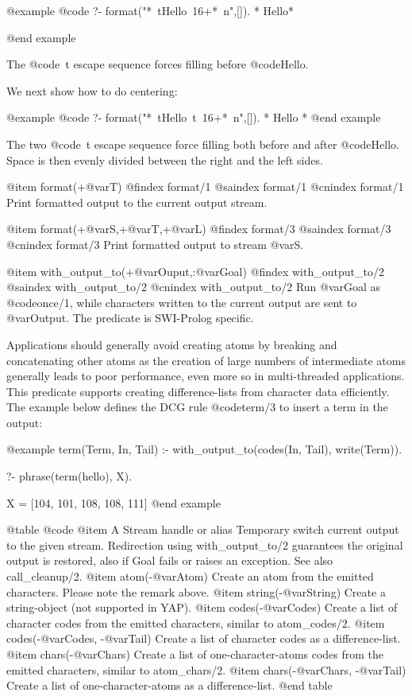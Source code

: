 {{{{{@example
@code{
   ?- format("*~tHello~16+*~n",[]).
*          Hello*
}

@end example


The @code{~t} escape sequence forces filling before @code{Hello}. 

We next show how to do centering:

@example
@code{
   ?- format("*~tHello~t~16+*~n",[]).
*     Hello     *
}
@end example


The two @code{~t} escape sequence force filling both before and after
@code{Hello}. Space is then evenly divided between the right and the
left sides.


@item format(+@var{T})
@findex format/1
@saindex format/1
@cnindex format/1
Print formatted output to the current output stream.


@item format(+@var{S},+@var{T},+@var{L})
@findex format/3
@saindex format/3
@cnindex format/3
Print formatted output to stream @var{S}.

@item with_output_to(+@var{Ouput},:@var{Goal})
@findex with_output_to/2
@saindex with_output_to/2
@cnindex with_output_to/2
Run @var{Goal} as @code{once/1}, while characters written to the current
output are sent to @var{Output}. The predicate is SWI-Prolog
specific.

Applications should generally avoid creating atoms by breaking and
concatenating other atoms as the creation of large numbers of
intermediate atoms generally leads to poor performance, even more so in
multi-threaded applications. This predicate supports creating
difference-lists from character data efficiently. The example below
defines the DCG rule @code{term/3} to insert a term in the output:

@example
 term(Term, In, Tail) :-
        with_output_to(codes(In, Tail), write(Term)).

?- phrase(term(hello), X).

X = [104, 101, 108, 108, 111]
@end example

@table @code
@item A Stream handle or alias
    Temporary switch current output to the given stream. Redirection using with_output_to/2 guarantees the original output is restored, also if Goal fails or raises an exception. See also call_cleanup/2. 
@item atom(-@var{Atom})
    Create an atom from the emitted characters. Please note the remark above. 
@item string(-@var{String})
    Create a string-object (not supported in YAP). 
@item codes(-@var{Codes})
    Create a list of character codes from the emitted characters, similar to atom_codes/2. 
@item codes(-@var{Codes}, -@var{Tail})
    Create a list of character codes as a difference-list. 
@item chars(-@var{Chars})
    Create a list of one-character-atoms codes from the emitted characters, similar to atom_chars/2. 
@item chars(-@var{Chars}, -@var{Tail})
    Create a list of one-character-atoms as a difference-list. 
@end table

}}}}}

